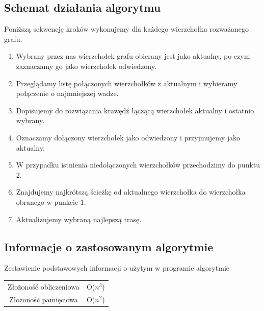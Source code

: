 \documentclass[10pt,oneside]{article}
\begin{document}
\subsection{Schemat działania algorytmu}
 Poniższą sekwencję kroków wykonujemy dla każdego wierzchołka rozważanego grafu.
\newline
\begin{enumerate}
	\item Wybrany przez nas wierzchołek grafu obierany jest jako aktualny, po czym zaznaczamy go jako wierzchołek odwiedzony.
	\item Przeglądamy listę połączonych wierzchołków z aktualnym i wybieramy połączenie o najmniejszej wadze.
	\item Dopisujemy do rozwiązania krawędź łączącą wierzchołek aktualny i ostatnio wybrany.
	\item Oznaczamy dołączony wierzchołek jako odwiedzony i przyjmujemy jako aktualny.
	\item W przypadku istnienia niedołączonych wierzchołków przechodzimy do punktu 2.
	\item Znajdujemy najkrótszą ścieżkę od aktualnego wierzchołka do wierzchołka obranego w punkcie 1.
	\item Aktualizujemy wybraną najlepszą trasę.
\end{enumerate}

\subsection{Informacje o zastosowanym algorytmie}
\begin{center}
	Zestawienie podstawowych informacji o użytym w programie algorytmie
	\newline \newline
	\begin{tabular}{|c|c|} \hline
		Złożoność obliczeniowa & O($n^{3}$)
		\\[10pt] Złożoność pamięciowa & O($n^{2}$) \\ \hline
	\end{tabular}
\end{center}
\end{document}
